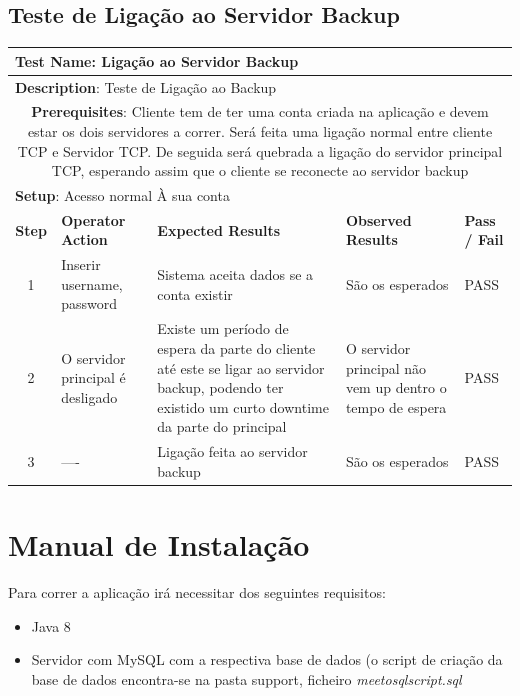 \documentclass[12pt]{article} %
\begin{document}
\subsection{Teste de Ligação ao Servidor Backup}
\begin{table}[ht!]
	\begin{tabular}{|c|p{4cm}|p{4cm}|p{3cm}|p{1cm}|}
		\hline
		\multicolumn{5}{|l|}{\textbf{Test Name}: Ligação ao Servidor Backup}\\
		\hline
		\multicolumn{5}{|l|}{\textbf{Description}: Teste de Ligação ao Backup}\\
		\hline
		\multicolumn{5}{|p{14,5cm}|}{\textbf{Prerequisites}: Cliente tem de ter uma conta criada na aplicação e devem estar os dois servidores a correr. Será feita uma ligação normal entre cliente TCP e Servidor TCP. De seguida será quebrada a ligação do servidor principal TCP, esperando assim que o cliente se reconecte ao servidor backup}\\
		\hline
		\multicolumn{5}{|l|}{\textbf{Setup}: Acesso normal À sua conta}\\
		\hline
		\textbf{Step} & \textbf{Operator Action} & \textbf{Expected Results} & \textbf{Observed Results} & \textbf{Pass / Fail}\\
		\hline
		1 & Inserir username, password & Sistema aceita dados se a conta existir & São os esperados & PASS\\
		\hline
		2 & O servidor principal é desligado & Existe um período de espera da parte do cliente até este se ligar ao servidor backup, podendo ter existido um curto downtime da parte do principal & O servidor principal não vem up dentro o tempo de espera & PASS\\
		\hline
		3 & ---- & Ligação feita ao servidor backup & São os esperados & PASS\\
		\hline
	\end{tabular}
\end{table}




\newpage
\section{Manual de Instalação}
\label{sec:install}
Para correr a aplicação irá necessitar dos seguintes requisitos:
\begin{itemize}
	\item Java 8
	\item Servidor com MySQL com a respectiva base de dados (o script de criação da base de dados encontra-se na pasta support, ficheiro \emph{meetosqlscript.sql}
\end{itemize}
\end{document}
